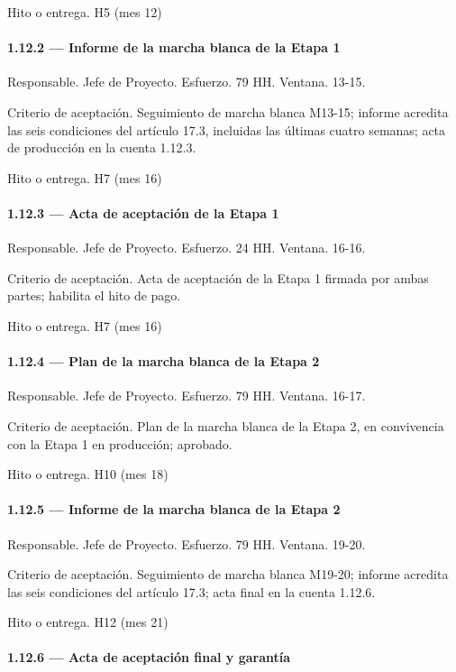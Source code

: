 \documentclass[11pt]{article}
\begin{document}
Hito o entrega. H5 (mes 12)

\paragraph{1.12.2 — Informe de la marcha blanca de la Etapa 1}

Responsable. Jefe de Proyecto. Esfuerzo. 79 HH. Ventana. 13-15.

Criterio de aceptación. Seguimiento de marcha blanca M13-15; informe acredita las seis condiciones del artículo 17.3, incluidas las últimas cuatro semanas; acta de producción en la cuenta 1.12.3.

Hito o entrega. H7 (mes 16)

\paragraph{1.12.3 — Acta de aceptación de la Etapa 1}

Responsable. Jefe de Proyecto. Esfuerzo. 24 HH. Ventana. 16-16.

Criterio de aceptación. Acta de aceptación de la Etapa 1 firmada por ambas partes; habilita el hito de pago.

Hito o entrega. H7 (mes 16)

\paragraph{1.12.4 — Plan de la marcha blanca de la Etapa 2}

Responsable. Jefe de Proyecto. Esfuerzo. 79 HH. Ventana. 16-17.

Criterio de aceptación. Plan de la marcha blanca de la Etapa 2, en convivencia con la Etapa 1 en producción; aprobado.

Hito o entrega. H10 (mes 18)

\paragraph{1.12.5 — Informe de la marcha blanca de la Etapa 2}

Responsable. Jefe de Proyecto. Esfuerzo. 79 HH. Ventana. 19-20.

Criterio de aceptación. Seguimiento de marcha blanca M19-20; informe acredita las seis condiciones del artículo 17.3; acta final en la cuenta 1.12.6.

Hito o entrega. H12 (mes 21)

\paragraph{1.12.6 — Acta de aceptación final y garantía}
\end{document}
